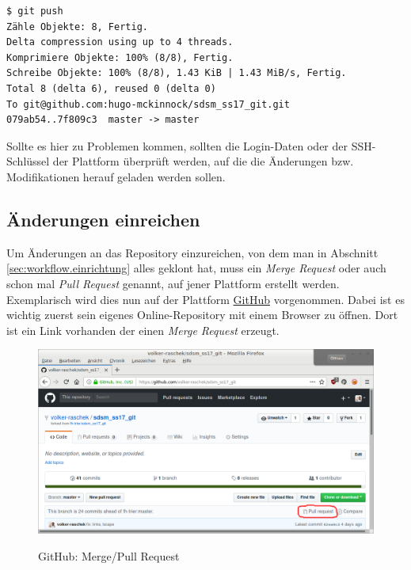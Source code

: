 \begin{verbatim}
$ git push
Zähle Objekte: 8, Fertig.
Delta compression using up to 4 threads.
Komprimiere Objekte: 100% (8/8), Fertig.
Schreibe Objekte: 100% (8/8), 1.43 KiB | 1.43 MiB/s, Fertig.
Total 8 (delta 6), reused 0 (delta 0)
To git@github.com:hugo-mckinnock/sdsm_ss17_git.git
079ab54..7f809c3  master -> master
\end{verbatim}

\begin{INFO}
  Sollte es hier zu Problemen kommen, sollten die Login-Daten oder der SSH-Schlüssel der Plattform überprüft werden, auf die die Änderungen bzw. Modifikationen herauf geladen werden sollen. 
\end{INFO}


\subsection{Änderungen einreichen}
\label{sec:work-with-git.send-merge-request}
Um Änderungen an das Repository einzureichen, von dem man in Abschnitt \ref{sec:workflow.einrichtung} alles geklont hat, muss ein \textit{Merge Request} oder auch schon mal \textit{Pull Request} genannt, auf jener Plattform erstellt werden. Exemplarisch wird dies nun auf der Plattform \href{https://github.com}{GitHub} vorgenommen. Dabei ist es wichtig zuerst sein eigenes Online-Repository mit einem Browser zu öffnen. Dort ist ein Link vorhanden der einen \textit{Merge Request} erzeugt.

\begin{figure}[H]
  \centering
  \includegraphics[width=1\textwidth]{images//pull-request.png}
  \label{img:github-pull-request}
  \caption{GitHub: Merge/Pull Request}
\end{figure}

